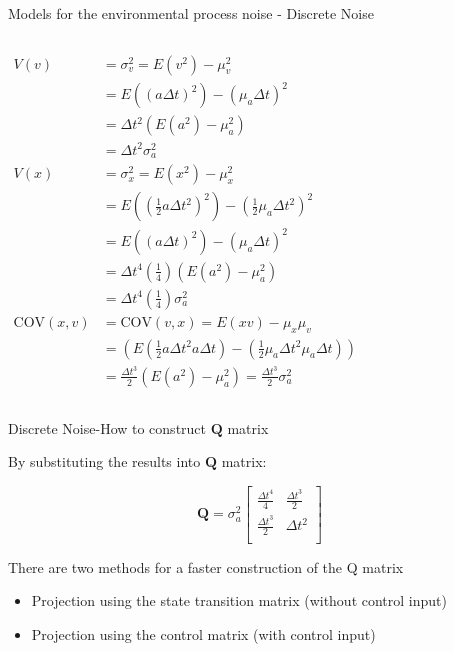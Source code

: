 \begin{frame}{Models for the environmental process noise - Discrete Noise}
\begin{columns}
\begin{align*}
V(v) &= \sigma_v^2 = E(v^2) - \mu_v^2\\
 & = E\left((a\Delta t)^2\right) - (\mu_a \Delta t)^2\\
& = \Delta t^2 \left( E(a^2) - \mu_a^2 \right)\\ & = \Delta t^2 \sigma_a^2\\
V(x) &= \sigma_x^2 = E(x^2) - \mu_x^2\\
& = E\left(\left(\frac{1}{2} a \Delta t^2\right)^2\right) - \left(\frac{1}{2} \mu_a \Delta t^2\right)^2\\
& = E\left((a\Delta t)^2\right) - (\mu_a \Delta t)^2\\
& = \Delta t^4 \left( \frac{1}{4} \right) \left( E(a^2) - \mu_a^2 \right)\\ 
& = \Delta t^4 \left( \frac{1}{4} \right) \sigma_a^2\\
\text{COV}(x, v) & = \text{COV}(v, x) = E(xv) - \mu_x\mu_v\\
& = \!\left( E\left( \frac{1}{2} a\Delta t^2 a\Delta t \right) \!-\! \left( \frac{1}{2} \mu_a\Delta t^2 \mu_a\Delta t \right)\! \right)\\ 
& = \frac{\Delta t^3}{2} \left( E(a^2) - \mu_a^2 \right) = \frac{\Delta t^3}{2} \sigma_a^2
\end{align*}
\end{columns}
\end{frame}
\begin{frame}{Discrete Noise-How to construct  $\mathbf{Q}$ matrix}

By substituting the results into $\mathbf{Q}$ matrix:

    $$\mathbf{Q} = \sigma_a^2
\begin{bmatrix}
\frac{\Delta t^4}{4} & \frac{\Delta t^3}{2} \\
\frac{\Delta t^3}{2} & \Delta t^2 \\
\end{bmatrix}$$

There are two methods for a faster construction of the Q matrix
\begin{itemize}
    \item Projection using the state transition matrix (without control input)
    \item Projection using the control matrix (with control input)
\end{itemize}
\end{frame}

